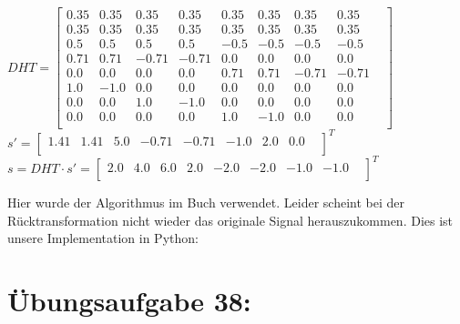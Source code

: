 	$
    DHT =
    \begin{bmatrix}
    0.35 & 0.35 & 0.35 & 0.35 & 0.35 & 0.35 & 0.35 & 0.35 & \\
    0.35 & 0.35 & 0.35 & 0.35 & 0.35 & 0.35 & 0.35 & 0.35 & \\
    0.5 & 0.5 & 0.5 & 0.5 & -0.5 & -0.5 & -0.5 & -0.5 & \\
    0.71 & 0.71 & -0.71 & -0.71 & 0.0 & 0.0 & 0.0 & 0.0 & \\
    0.0 & 0.0 & 0.0 & 0.0 & 0.71 & 0.71 & -0.71 & -0.71 & \\
    1.0 & -1.0 & 0.0 & 0.0 & 0.0 & 0.0 & 0.0 & 0.0 & \\
    0.0 & 0.0 & 1.0 & -1.0 & 0.0 & 0.0 & 0.0 & 0.0 & \\
    0.0 & 0.0 & 0.0 & 0.0 & 1.0 & -1.0 & 0.0 & 0.0 & \\
    \end{bmatrix}
    $ \\ $
    s' =
    \begin{bmatrix}
    1.41 & 1.41 & 5.0 & -0.71 & -0.71 & -1.0 & 2.0 & 0.0 & \\
    \end{bmatrix}
    ^T $ \\ $
    s = DHT \cdot s' =
    \begin{bmatrix}
    2.0 & 4.0 & 6.0 & 2.0 & -2.0 & -2.0 & -1.0 & -1.0 & \\
    \end{bmatrix}
    ^T $ \newline

    Hier wurde der Algorithmus im Buch verwendet. Leider scheint bei der Rücktransformation nicht wieder das originale Signal herauszukommen.
    Dies ist unsere Implementation in Python: \newline
    



\newpage
	\section*{Übungsaufgabe 38:}

